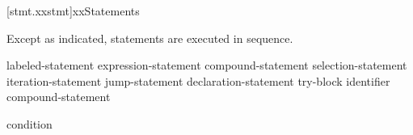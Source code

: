 [stmt.xxstmt]{xxStatements}%



\pnum
Except as indicated, statements are executed in sequence.

\begin{bnf}
\br
    labeled-statement\br
     expression-statement\br
     compound-statement\br
     selection-statement\br
     iteration-statement\br
     jump-statement\br
    declaration-statement\br
     try-block\br
     identifier  compound-statement \atomicc\br

 \atomicc\br
     condition \terminal{)} \atomicc

\end{bnf}
